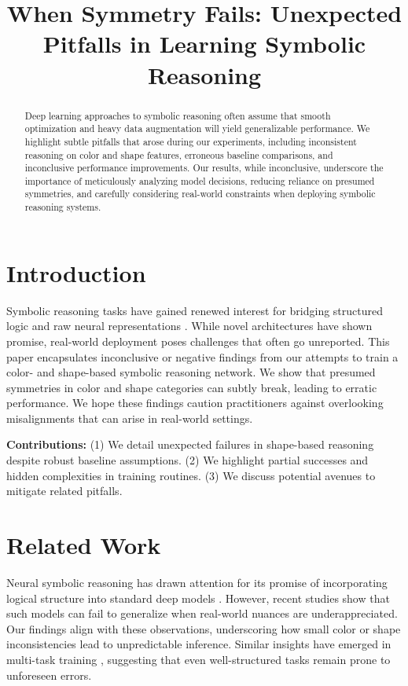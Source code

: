 \documentclass[11pt]{article}
\begin{document}
\title{When Symmetry Fails: Unexpected Pitfalls in Learning Symbolic Reasoning}
\author{}
\date{}
\maketitle

\begin{abstract}
Deep learning approaches to symbolic reasoning often assume that smooth optimization and heavy data augmentation will yield generalizable performance. We highlight subtle pitfalls that arose during our experiments, including inconsistent reasoning on color and shape features, erroneous baseline comparisons, and inconclusive performance improvements. Our results, while inconclusive, underscore the importance of meticulously analyzing model decisions, reducing reliance on presumed symmetries, and carefully considering real-world constraints when deploying symbolic reasoning systems.
\end{abstract}

\section{Introduction}
Symbolic reasoning tasks have gained renewed interest for bridging structured logic and raw neural representations \cite{lake2018,evans2021}. While novel architectures have shown promise, real-world deployment poses challenges that often go unreported. This paper encapsulates inconclusive or negative findings from our attempts to train a color- and shape-based symbolic reasoning network. We show that presumed symmetries in color and shape categories can subtly break, leading to erratic performance. We hope these findings caution practitioners against overlooking misalignments that can arise in real-world settings.

\textbf{Contributions:} (1) We detail unexpected failures in shape-based reasoning despite robust baseline assumptions. (2) We highlight partial successes and hidden complexities in training routines. (3) We discuss potential avenues to mitigate related pitfalls.

\section{Related Work}
Neural symbolic reasoning has drawn attention for its promise of incorporating logical structure into standard deep models \cite{mao2019,garcez2019}\@. However, recent studies show that such models can fail to generalize \cite{lake2018} when real-world nuances are underappreciated. Our findings align with these observations, underscoring how small color or shape inconsistencies lead to unpredictable inference. Similar insights have emerged in multi-task training \cite{evans2021}, suggesting that even well-structured tasks remain prone to unforeseen errors.
\end{document}

